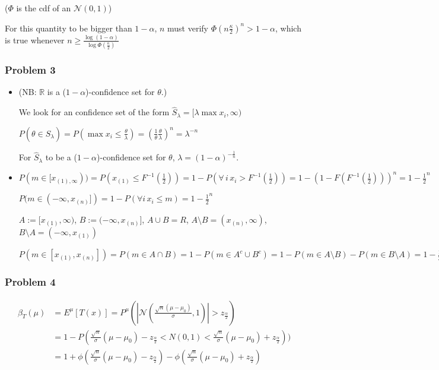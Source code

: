 \documentclass[12pt]{article}
\newcommand{\Q}[1]{\subsubsection*{Problem #1}}
\newcommand{\union}[1]{\underset{#1}{\cup} }
\newcommand{\inter}[1]{\underset{#1}{\cap} }
\begin{document}
($\Phi$ is the cdf of an $\mathcal N(0,1)$)

For this quantity to be bigger than $1 - \alpha$, $n$ must verify  $ \Phi(n\frac{\kappa}2)^n > 1 - \alpha$, which is true whenever $n \ge \frac{\log(1-\alpha)}{\log \Phi(\frac{\kappa} 2)}$



\Q{3}

\begin{itemize}
\item

(NB: $\mathbb R$ is a ($1-\alpha$)-confidence set for $\theta$.)


We look for an confidence set of the form 
$\hat S_{\lambda} = [\lambda \max x_i, \infty)$


$P(\theta \in \hat S_{\lambda}) = P(\max x_i \le \frac{\theta}{\lambda}) = (\frac 1 {\theta} \frac{\theta}{\lambda})^n = \lambda^{-n}$

For $\hat S_{\lambda}$ to be  a ($1-\alpha$)-confidence set for $\theta$, $\lambda = (1-\alpha)^{-\frac1 n}$.


\item $P(m \in [x_{(1), \infty})) = P(x_{(1)} \leq F^{-1}(\frac 1 2)) = 1 - P(\forall \, i \, x_i > F^{-1}(\frac 1 2)) = 1 - (1 - F(F^{-1}(\frac 1 2)))^n = 1 - \frac 1 2^n$


$P(m \in (- \infty, x_{(n)}]) = 1 - P(\forall i \, x_i \leq m) = 1 - \frac 1 2^n$

$A := [x_{(1)}, \infty)$, $B := (- \infty, x_{(n)}]$, $A \cup B = R$, $A \setminus B = (x_{(n)}, \infty)$, $B \setminus A = (- \infty, x_{(1)}) $


$P(m \in [x_{(1)}, x_{(n)}]) = P(m \in A \inter{} B) = 1 - P(m \in A^c \union{} B^c) = 1 - P(m \in A \setminus B) - P(m \in B \setminus A) = 1 - \frac 1 2^{n-1}$

\end{itemize}


\Q{4}

\begin{align}
\beta_T(\mu) &= E^{\mu}[T(x)] = P^{\mu}(|\mathcal N(\frac{\sqrt n(\mu - \mu_0)}{\sigma}, 1)| > z_{\frac{\alpha}2})
\\&= 1 - P(\frac{\sqrt n}{\sigma}(\mu-\mu_0) - z_{\frac{\alpha}2} < N(0, 1) < \frac{\sqrt n}{\sigma}(\mu-\mu_0) + z_{\frac{\alpha}2}))
\\&=  1 + \phi(  \frac{\sqrt n}{\sigma}(\mu-\mu_0) - z_{\frac{\alpha}2}) - \phi( \frac{\sqrt n}{\sigma}(\mu-\mu_0) + z_{\frac{\alpha}2})
\end{align}
\end{document}

